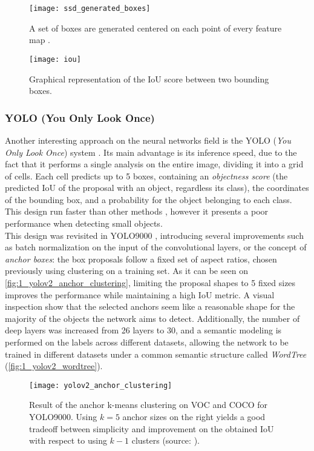 \begin{figure}[h]
	\centering
	\texttt{[image: ssd\_generated\_boxes]}
	\caption{A set of boxes are generated centered on each point of every feature map \cite{ssd}.}
	\label{fig:1_ssd_generated_boxes}
\end{figure}

\begin{figure}[h]
	\centering
	\texttt{[image: iou]}
	\caption{Graphical representation of the IoU score between two bounding boxes.}
	\label{fig:1_iou}
\end{figure}

\subsubsection{YOLO (You Only Look Once)}

Another interesting approach on the neural networks field is the YOLO (\textit{You Only Look Once}) system \cite{yolov1}. Its main advantage is its inference speed, due to the fact that it performs a single analysis on the entire image, dividing it into a grid of cells. Each cell predicts up to 5 boxes, containing an \textit{objectness score} (the predicted IoU of the proposal with an object, regardless its class), the coordinates of the bounding box, and a probability for the object belonging to each class. This design run faster than other methods \cite{yolov1}, however it presents a poor performance when detecting small objects.\\

This design was revisited in YOLO9000 \cite{yolov2}, introducing several improvements such as batch normalization on the input of the convolutional layers, or the concept of \textit{anchor boxes}: the box proposals follow a fixed set of aspect ratios, chosen previously using clustering on a training set. As it can be seen on \autoref{fig:1_yolov2_anchor_clustering}, limiting the proposal shapes to 5 fixed sizes improves the performance while maintaining a high IoU metric. A visual inspection show that the selected anchors seem like a reasonable shape for the majority of the objects the network aims to detect. Additionally, the number of deep layers was increased from 26 layers to 30, and a semantic modeling is performed on the labels across different datasets, allowing the network to be trained in different datasets under a common semantic structure called \textit{WordTree} (\autoref{fig:1_yolov2_wordtree}).

\begin{figure}[h]
	\centering
	\texttt{[image: yolov2\_anchor\_clustering]}
	\caption{Result of the anchor k-means clustering on VOC and COCO for YOLO9000. Using $k=5$ anchor sizes on the right yields a good tradeoff between simplicity and improvement on the obtained IoU with respect to using $k-1$ clusters (source: \cite{yolov2}).}
	\label{fig:1_yolov2_anchor_clustering}
\end{figure}

